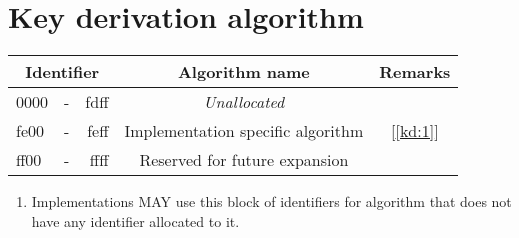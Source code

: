 \documentclass[a4paper,12pt]{article}
\newcommand{\see}[1]{[\ref{#1}]}
\begin{document}
	\section{Key derivation algorithm}
		\begin{tabular}{|lcr||c|c|}
			\hline 
			\multicolumn{3}{|c||}{Identifier} &  Algorithm name & Remarks \\\hline 
			0000&-&fdff&\textit{Unallocated}&  \\\hline
			fe00&-&feff&Implementation specific algorithm& \see{kd:1}\\\hline
			ff00&-&ffff&Reserved for future expansion&  \\\hline 
		\end{tabular}
		\begin{enumerate}
			\item \label{kd:1}Implementations MAY use this block of identifiers for algorithm that does not have any identifier allocated to it.
		\end{enumerate}
\end{document}
